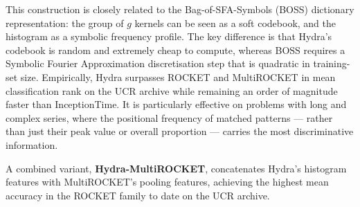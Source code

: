 This construction is closely related to the Bag-of-SFA-Symbols (BOSS) dictionary representation: the group of $g$ kernels can be seen as a soft codebook, and the histogram as a symbolic frequency profile. The key difference is that Hydra's codebook is random and extremely cheap to compute, whereas BOSS requires a Symbolic Fourier Approximation discretisation step that is quadratic in training-set size. Empirically, Hydra surpasses ROCKET and MultiROCKET in mean classification rank on the UCR archive while remaining an order of magnitude faster than InceptionTime. It is particularly effective on problems with long and complex series, where the positional frequency of matched patterns --- rather than just their peak value or overall proportion --- carries the most discriminative information.

A combined variant, \textbf{Hydra-MultiROCKET}, concatenates Hydra's histogram features with MultiROCKET's pooling features, achieving the highest mean accuracy in the ROCKET family to date on the UCR archive.
